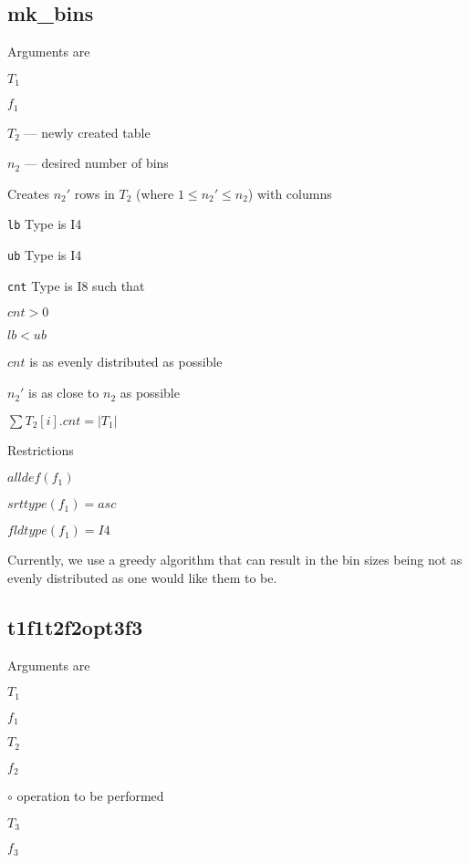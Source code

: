 
\subsection{mk\_bins}
\label{mk_bins}

Arguments are
\be
\item \(T_1\)
\item \(f_1\)
\item \(T_2\) --- newly created table 
\item \(n_2\) --- desired number of bins
\ee

Creates \(n_2'\) rows in \(T_2\) (where \(1 \leq n_2' \leq n_2\)) with columns
\be
\item \verb+lb+  Type is I4
\item \verb+ub+  Type is I4
\item \verb+cnt+ Type is I8
\ee
such that 
\be
\item \(cnt > 0 \)
\item \(lb < ub \)
\item \(cnt\) is as evenly distributed as possible
\item \(n_2'\) is as close to \(n_2\) as possible
\item \(\sum T_2[i].cnt = |T_1|\)
\ee

Restrictions
\be
\item \(alldef(f_1)\) 
\item \(srttype(f_1) = asc\) 
\item \(fldtype(f_1) = I4\)
\item Currently, we use a greedy algorithm that can result in the bin
sizes being not as evenly distributed as one would like them to be.
\ee


\subsection{t1f1t2f2opt3f3}
\label{t1f1t2f2opt3f3}

Arguments are
\be
\item \(T_1\)
\item \(f_1\)
\item \(T_2\) 
\item \(f_2\)
\item \(\circ\) operation to be performed
\item \(T_3\) 
\item \(f_3\)
\ee

